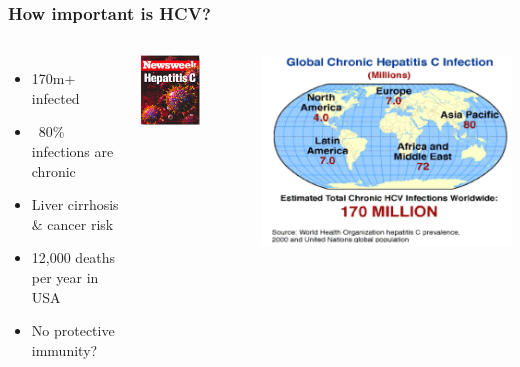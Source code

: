\begin{frame}
\frametitle{How important is HCV?}

\begin{columns}[t]


\footnotesize{
\begin{itemize}
	\item 170m+ infected
	\item ~80\% infections are chronic
	\item Liver cirrhosis \& cancer risk
	\item 12,000 deaths per year in USA
	\item No protective immunity?
\end{itemize}
}

\includegraphics[width=0.6\textwidth]{../../images/Cover}


\includegraphics[width=\textwidth]{../../images/GlobeHCV}

\end{columns}

\end{frame}


